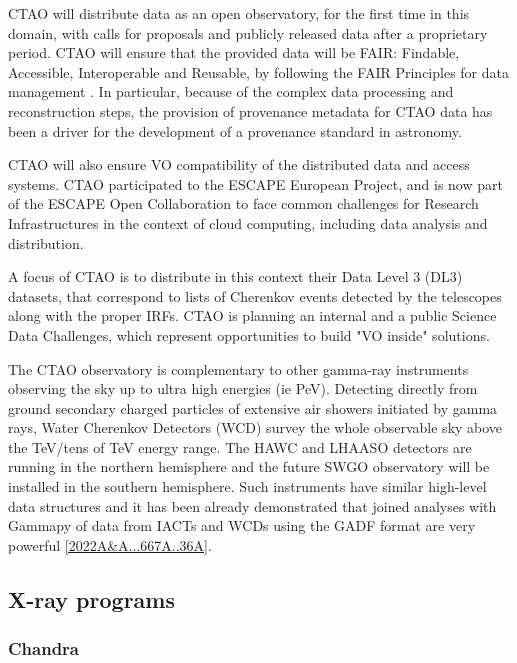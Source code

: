 \documentclass[11pt,a4paper]{ivoa}
\begin{document}
CTAO will distribute data as an open observatory, for the first time in this domain, with calls for proposals and
publicly released data after a proprietary period. CTAO will ensure that the provided data will be FAIR: Findable,
Accessible, Interoperable and Reusable, by following the FAIR Principles for data management \citep{Wilkinson2016}.
In particular, because of the complex data processing and reconstruction steps, the provision of provenance metadata
for CTAO data has been a driver for the development of a provenance standard in astronomy.

CTAO will also ensure VO compatibility of the distributed data and access systems. CTAO participated to the ESCAPE
European Project, and is now part of the ESCAPE Open Collaboration to face common challenges for Research Infrastructures
in the context of cloud computing, including data analysis and distribution.

A focus of CTAO is to distribute in this context their Data Level 3 (DL3) datasets, that correspond to lists of Cherenkov
events detected by the telescopes along with the proper IRFs. CTAO is planning an internal and a public Science Data
Challenges, which represent opportunities to build "VO inside" solutions.

The CTAO observatory is complementary to other gamma-ray instruments observing the sky up to ultra high energies (ie PeV).
Detecting directly from ground secondary charged particles of extensive air showers initiated by gamma rays, Water
Cherenkov Detectors (WCD) survey the whole observable sky above the TeV/tens of TeV energy range. The HAWC and LHAASO
detectors are running in the northern hemisphere and the future SWGO observatory will be installed in the southern
hemisphere. Such instruments have similar high-level data structures and it has been already demonstrated that joined
analyses with Gammapy of data from IACTs and WCDs using the GADF format are very powerful \ref{2022A&A...667A..36A}.

\subsection{X-ray programs}

\subsubsection{Chandra}\label{sec:chandra}
\end{document}
